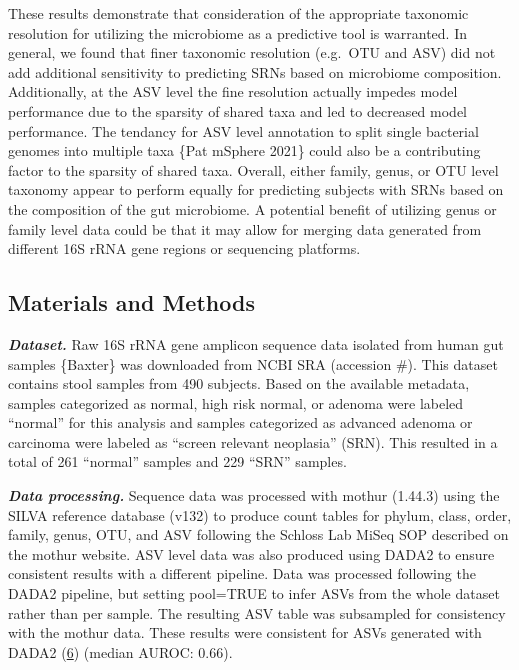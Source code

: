 \documentclass[
]{article}
\begin{document}
These results demonstrate that consideration of the appropriate
taxonomic resolution for utilizing the microbiome as a predictive tool
is warranted. In general, we found that finer taxonomic resolution
(e.g.~OTU and ASV) did not add additional sensitivity to predicting SRNs
based on microbiome composition. Additionally, at the ASV level the fine
resolution actually impedes model performance due to the sparsity of
shared taxa and led to decreased model performance. The tendancy for ASV
level annotation to split single bacterial genomes into multiple taxa
\{Pat mSphere 2021\} could also be a contributing factor to the sparsity
of shared taxa. Overall, either family, genus, or OTU level taxonomy
appear to perform equally for predicting subjects with SRNs based on the
composition of the gut microbiome. A potential benefit of utilizing
genus or family level data could be that it may allow for merging data
generated from different 16S rRNA gene regions or sequencing platforms.

\hypertarget{materials-and-methods}{%
\subsection{Materials and Methods}\label{materials-and-methods}}

\textbf{\emph{Dataset.}} Raw 16S rRNA gene amplicon sequence data
isolated from human gut samples \{Baxter\} was downloaded from NCBI SRA
(accession \#). This dataset contains stool samples from 490 subjects.
Based on the available metadata, samples categorized as normal, high
risk normal, or adenoma were labeled ``normal'' for this analysis and
samples categorized as advanced adenoma or carcinoma were labeled as
``screen relevant neoplasia'' (SRN). This resulted in a total of 261
``normal'' samples and 229 ``SRN'' samples.

\textbf{\emph{Data processing.}} Sequence data was processed with mothur
(1.44.3) using the SILVA reference database (v132) to produce count
tables for phylum, class, order, family, genus, OTU, and ASV following
the Schloss Lab MiSeq SOP described on the mothur website. ASV level
data was also produced using DADA2 to ensure consistent results with a
different pipeline. Data was processed following the DADA2 pipeline, but
setting pool=TRUE to infer ASVs from the whole dataset rather than per
sample. The resulting ASV table was subsampled for consistency with the
mothur data. These results were consistent for ASVs generated with DADA2
(\protect\hyperlink{ref-callahan2016}{6}) (median AUROC: 0.66).
\end{document}
